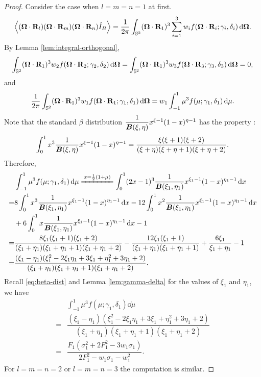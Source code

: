   \begin{proof}
    Consider the case when $l = m = n = 1$ at first.
    \[
      \left\langle  (\boldsymbol{\Omega}\cdot\mathbf{R}_l) (\boldsymbol{\Omega}\cdot\mathbf{R}_m)
      (\boldsymbol{\Omega}\cdot\mathbf{R}_n) \hat I_B \right\rangle = 
      \dfrac1{2\pi} \int_{\mathbb{S}^2} (\boldsymbol{\Omega}\cdot\mathbf{R}_1)^3  
      \sum_{i = 1}^3 w_i f(\boldsymbol{\Omega}\cdot\mathbf{R}_i; 
      \gamma_i, \delta_i) \,{\rm d}\boldsymbol{\Omega}.
    \]
    By Lemma \ref{lem:integral-orthogonal},
    \[
      \int_{\mathbb{S}^2} (\boldsymbol{\Omega}\cdot\mathbf{R}_1)^3 w_2 f(\boldsymbol{\Omega}\cdot\mathbf{R}_2;
      \gamma_2, \delta_2) \,{\rm d}\boldsymbol{\Omega} = \int_{\mathbb{S}^2}
      (\boldsymbol{\Omega}\cdot\mathbf{R}_1)^3 w_3 f(\boldsymbol{\Omega}\cdot\mathbf{R}_3; \gamma_3, \delta_3)
      \,{\rm d}\boldsymbol{\Omega} = 0,
    \]
    and
    \[
      \dfrac1{2\pi} \int_{\mathbb{S}^2} (\boldsymbol{\Omega}\cdot\mathbf{R}_1)^3  
      w_1 f(\boldsymbol{\Omega}\cdot\mathbf{R}_1; \gamma_1, \delta_1)
      \,{\rm d}\boldsymbol{\Omega} = w_1 \int_{-1}^1
      \mu^3 f(\mu;\gamma_1,\delta_1) \,{\rm d}\mu.
    \]
Note that the standard $\beta$ distribution
$\dfrac1{\boldsymbol{B}(\xi,\eta)} x^{\xi - 1} (1 - x)^{\eta - 1}$ has the
property \cite{johnson1970discrete}:
\[
  \int_0^1 x^3 \dfrac1{\boldsymbol{B}(\xi,\eta)} x^{\xi - 1}
  (1 - x)^{\eta - 1} = \dfrac{\xi (\xi + 1) (\xi + 2)}
  {(\xi + \eta)(\xi + \eta + 1)(\xi + \eta + 2)}.
\]
Therefore,
\[
  \begin{split}
    & \int_{-1}^1 \mu^3 f(\mu;\gamma_1,\delta_1)
    \dd\mu  
    \xlongequal{x = \frac12 (1 + \mu)} 
    \int_0^1 (2x - 1)^3 \dfrac1{\Beta(\xi_1, \eta_1)} 
    x^{\xi_1 - 1} (1-x)^{\eta_1 - 1} \dd x\\
    = & 8\int_0^1 x^3 \dfrac1{\Beta(\xi_1, \eta_1)}
    x^{\xi_1 - 1} (1 - x)^{\eta_1 - 1} \dd x
    - 12\int_0^1 x^2 \dfrac1{\Beta(\xi_1, \eta_1)}
    x^{\xi_1 - 1} (1 - x)^{\eta_1 - 1} \dd x\\
    & + 6\int_0^1 x \dfrac1{\Beta(\xi_1, \eta_1)}
    x^{\xi_1 - 1} (1 - x)^{\eta_1 - 1} \dd x
    - 1 \\
    = & \dfrac{8 \xi_1 (\xi_1 + 1) (\xi_1 + 2)}{(\xi_1 + \eta_1)
  (\xi_1 + \eta_1 + 1) (\xi_1 + \eta_1 + 2)} -  
  \dfrac{12 \xi_1 (\xi_1 + 1)}{(\xi_1 + \eta_1)
  (\xi_1 + \eta_1 + 1)} + \dfrac{6 \xi_1}{\xi_1 + \eta_1}
  - 1\\ 
  =  & \dfrac{(\xi_1 - \eta_1) (\xi_1^2 - 2 \xi_1 \eta_1 + 3 \xi_1
  + \eta_1^2 + 3 \eta_1 + 2)}{(\xi_1 + \eta_1) (\xi_1 + \eta_1 + 1)
  (\xi_1 + \eta_1 + 2)}.
\end{split}
  \]
  Recall \eqref{eq:beta-dist} and Lemma \ref{lem:gamma-delta}
  for the values of $\xi_1$ and $\eta_1$, we have
  \[
    \begin{split}
      & \int_{-1}^1 \mu^3 f(\mu;\gamma_1,\delta_1)
      \dd\mu \\
      = & \dfrac{(\xi_1 - \eta_1) (\xi_1^2 - 2 \xi_1 \eta_1 + 3 \xi_1
    + \eta_1^2 + 3 \eta_1 + 2)}{(\xi_1 + \eta_1) (\xi_1 + \eta_1 + 1)
    (\xi_1 + \eta_1 + 2)} \\
    = & \dfrac{ F_1 (\sigma_1^2 
  + 2 F_1^2 - 3 w_1 \sigma_1)}
  {2 F_1^2 - w_1 \sigma_1 - w_1^2}.
\end{split}
      \]
For $l = m = n = 2$ or $l = m = n = 3$ the computation is similar.


\end{proof}
